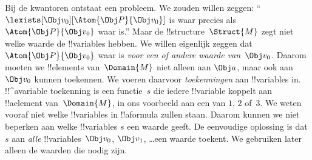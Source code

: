 \documentclass[../../../include/open-logic-section]{subfiles}
\begin{document}
Bij de kwantoren ontstaat een probleem. We zouden willen zeggen:
``$\lexists[\Obj v_0][\Atom{\Obj P}{\Obj v_0}]$ is waar precies als
$\Atom{\Obj P}{\Obj v_0}$ waar is.'' Maar de
!!{structure}~$\Struct{M}$ zegt niet welke waarde de !!{variable}s
hebben. We willen eigenlijk zeggen dat $\Atom{\Obj P}{\Obj v_0}$ waar
is \emph{voor een of andere waarde van~$\Obj v_0$}. Daarom moeten we
!!{element}s van~$\Domain{M}$ niet alleen aan $\Obj a$, maar ook
aan~$\Obj v_0$ kunnen toekennen. We voeren daarvoor \emph{toekenningen}
aan !!{variable}s in. !!^a{variable} toekenning is een functie~$s$ die
iedere !!{variable} koppelt aan !!a{element} van~$\Domain{M}$, in ons
voorbeeld aan een van $1$, $2$ of~$3$. We weten vooraf niet welke
!!{variable}s in !!a{formula} zullen staan. Daarom kunnen we niet
beperken aan welke !!{variable}s $s$ een waarde geeft. De eenvoudige
oplossing is dat $s$ aan \emph{alle} !!{variable}s~$\Obj v_0$,
$\Obj v_1$, \dots\@ een waarde toekent. We gebruiken later alleen de
waarden die nodig zijn.
\end{document}
